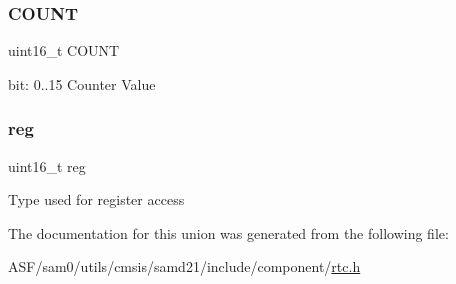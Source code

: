 \subsubsection{\texorpdfstring{COUNT}{COUNT}}
{\footnotesize\ttfamily uint16\+\_\+t C\+O\+U\+NT}

bit\+: 0..15 Counter Value \mbox{\label{union_r_t_c___m_o_d_e1___c_o_u_n_t___type_a11760f5020019f4aa8cb02e694f7cc44}} 
\subsubsection{\texorpdfstring{reg}{reg}}
{\footnotesize\ttfamily uint16\+\_\+t reg}

Type used for register access 

The documentation for this union was generated from the following file\+:\begin{DoxyCompactItemize}
\item 
A\+S\+F/sam0/utils/cmsis/samd21/include/component/\mbox{\hyperlink{component_2rtc_8h}{rtc.\+h}}\end{DoxyCompactItemize}
